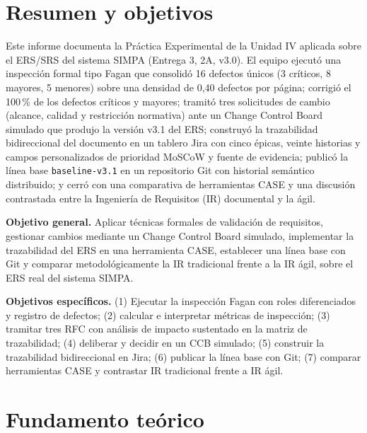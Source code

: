\documentclass[11pt,a4paper]{article}
\begin{document}
\section{Resumen y objetivos}

Este informe documenta la Práctica Experimental de la Unidad IV aplicada sobre el ERS/SRS del
sistema SIMPA (Entrega 3, 2A, v3.0). El equipo ejecutó una inspección formal tipo Fagan que
consolidó 16 defectos únicos (3 críticos, 8 mayores, 5 menores) sobre una densidad de 0,40
defectos por página; corrigió el 100\,\% de los defectos críticos y mayores; tramitó tres
solicitudes de cambio (alcance, calidad y restricción normativa) ante un Change Control Board
simulado que produjo la versión v3.1 del ERS; construyó la trazabilidad bidireccional del
documento en un tablero Jira con cinco épicas, veinte historias y campos personalizados de
prioridad MoSCoW y fuente de evidencia; publicó la línea base \texttt{baseline-v3.1} en un
repositorio Git con historial semántico distribuido; y cerró con una comparativa de herramientas
CASE y una discusión contrastada entre la Ingeniería de Requisitos (IR) documental y la ágil.

\textbf{Objetivo general.} Aplicar técnicas formales de validación de requisitos, gestionar
cambios mediante un Change Control Board simulado, implementar la trazabilidad del ERS en una
herramienta CASE, establecer una línea base con Git y comparar metodológicamente la IR
tradicional frente a la IR ágil, sobre el ERS real del sistema SIMPA.

\textbf{Objetivos específicos.} (1) Ejecutar la inspección Fagan con roles diferenciados y
registro de defectos; (2) calcular e interpretar métricas de inspección; (3) tramitar tres RFC
con análisis de impacto sustentado en la matriz de trazabilidad; (4) deliberar y decidir en un
CCB simulado; (5) construir la trazabilidad bidireccional en Jira; (6) publicar la línea base con
Git; (7) comparar herramientas CASE y contrastar IR tradicional frente a IR ágil.

\section{Fundamento teórico}
\end{document}
